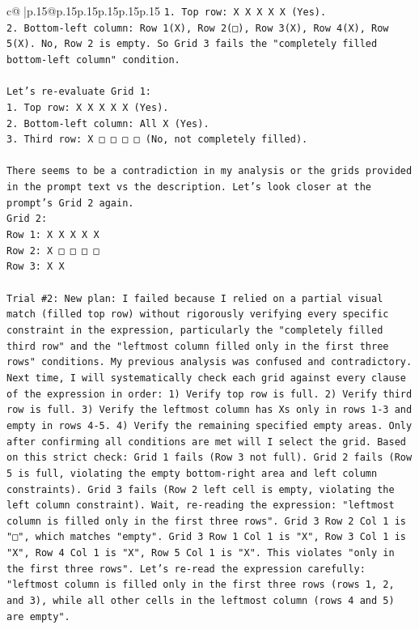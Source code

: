 \documentclass{article}
\begin{document}
{\begin{supertabular}{c@{$\;$}|p{.15\linewidth}@{}p{.15\linewidth}p{.15\linewidth}p{.15\linewidth}p{.15\linewidth}p{.15\linewidth}}
{{{\texttt{1. Top row: X X X X X (Yes).} \\
\texttt{2. Bottom{-}left column: Row 1(X), Row 2(□), Row 3(X), Row 4(X), Row 5(X). No, Row 2 is empty. So Grid 3 fails the "completely filled bottom{-}left column" condition.} \\
\\ 
\texttt{Let's re{-}evaluate Grid 1:} \\
\texttt{1. Top row: X X X X X (Yes).} \\
\texttt{2. Bottom{-}left column: All X (Yes).} \\
\texttt{3. Third row: X □ □ □ □ (No, not completely filled).} \\
\\ 
\texttt{There seems to be a contradiction in my analysis or the grids provided in the prompt text vs the description. Let's look closer at the prompt's Grid 2 again.} \\
\texttt{Grid 2:} \\
\texttt{Row 1: X X X X X} \\
\texttt{Row 2: X □ □ □ □} \\
\texttt{Row 3: X X} \\
\\ 
\texttt{Trial \#2: New plan: I failed because I relied on a partial visual match (filled top row) without rigorously verifying every specific constraint in the expression, particularly the "completely filled third row" and the "leftmost column filled only in the first three rows" conditions. My previous analysis was confused and contradictory. Next time, I will systematically check each grid against every clause of the expression in order: 1) Verify top row is full. 2) Verify third row is full. 3) Verify the leftmost column has Xs only in rows 1{-}3 and empty in rows 4{-}5. 4) Verify the remaining specified empty areas. Only after confirming all conditions are met will I select the grid. Based on this strict check: Grid 1 fails (Row 3 not full). Grid 2 fails (Row 5 is full, violating the empty bottom{-}right area and left column constraints). Grid 3 fails (Row 2 left cell is empty, violating the left column constraint). Wait, re{-}reading the expression: "leftmost column is filled only in the first three rows". Grid 3 Row 2 Col 1 is "□", which matches "empty". Grid 3 Row 1 Col 1 is "X", Row 3 Col 1 is "X", Row 4 Col 1 is "X", Row 5 Col 1 is "X". This violates "only in the first three rows". Let's re{-}read the expression carefully: "leftmost column is filled only in the first three rows (rows 1, 2, and 3), while all other cells in the leftmost column (rows 4 and 5) are empty".} \\
}}}
\end{supertabular}}
\end{document}
